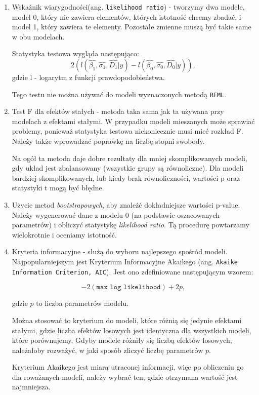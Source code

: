 \documentclass[12pt]{mwbk}
\theoremstyle{plain}
\theoremstyle{definition}
\theoremstyle{remark}
\begin{document}
\begin{enumerate}
	\item Wskaźnik wiarygodności(ang. \texttt{likelihood ratio}) - tworzymy dwa modele, model 0, który nie zawiera elementów, których istotność chcemy zbadać, i model 1, który zawiera te elementy. Pozostałe zmienne muszą być takie same w obu modelach.
	
	Statystyka testowa wygląda następująco:
	$$2(l(\hat{\beta_1}, \hat{\sigma_1}, \hat{D_1}|y)-l(\hat{\beta_0}, \hat{\sigma_0}, \hat{D_0}|y)),$$
	gdzie l - logarytm z funkcji prawdopodobieństwa.
	
	Tego testu nie można używać do modeli wyznaczonych metodą \texttt{REML}.
	
	\item Test F dla efektów stałych - metoda taka sama jak ta używana przy modelach z efektami stałymi. W przypadku modeli mieszanych może sprawiać problemy, ponieważ statystyka testowa niekoniecznie musi mieć rozkład F. Należy także wprowadzać poprawkę na liczbę stopni swobody.
	
	Na ogół ta metoda daje dobre rezultaty dla mniej skomplikowanych modeli, gdy układ jest zbalansowany (wszystkie grupy są równoliczne). Dla modeli bardziej skomplikowanych, lub kiedy brak równoliczności, wartości p oraz statystyki t mogą być błędne.
	
	\item Użycie metod \textit{bootstrapowych}, aby znaleźć dokładniejsze wartości p-value. Należy wygenerować dane z modelu 0 (na podstawie oszacowanych parametrów) i obliczyć statystykę \textit{likelihood ratio}. Tą procedurę powtarzamy wielokrotnie i oceniamy istotność.
	
	\item Kryteria informacyjne - służą do wyboru najlepszego spośród modeli. Najpopularniejszym jest Kryterium Informacyjne Akaikego (ang. \texttt{Akaike Information Criterion, AIC}). Jest ono zdefiniowane następującym wzorem:
	
	$$-2(\texttt{max log likelihood})+ 2p,$$
	
	gdzie $p$ to liczba parametrów modelu.
	
	Można stosować to kryterium do modeli, które różnią się jedynie efektami stałymi, gdzie liczba efektów losowych jest identyczna dla wszystkich modeli, które porównujemy. Gdyby modele różniły się liczbą efektów losowych, należałoby rozważyć, w jaki sposób zliczyć liczbę parametrów $p$.
	
	Kryterium Akaikego jest miarą utraconej informacji, więc po obliczeniu go dla roważanych modeli, należy wybrać ten, gdzie otrzymana wartość jest najmniejsza.

\end{enumerate}
\end{document}
